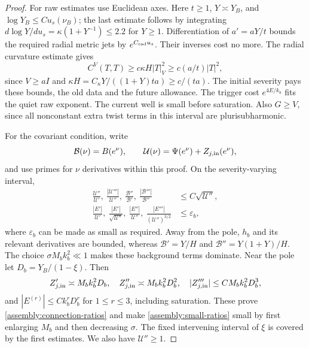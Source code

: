 \begin{proof}
For raw estimates use Euclidean axes. Here $t\geq1$, $Y\asymp Y_B$,
and $\log Y_B\leq C u_s(\nu_B)$; the last estimate follows by
integrating $d\log Y/du_s=\kappa(1+Y^{-1})\leq2.2$ for $Y\geq1$.
Differentiation of $a'=aY/t$ bounds the required radial metric jets
by $e^{C_{\rm rad}u_s}$. Their inverses cost no more. The radial
curvature estimate gives
\begin{equation}\label{assembly:euclidean-curvature}
 C^V(T,T)\geq c\kappa H|T|_V^2
 \geq c(a/t)|T|^2,
\end{equation}
since $V\geq aI$ and
$\kappa H=C_\kappa Y/((1+Y)ta)\geq c/(ta)$.
The initial severity pays these bounds, the old data and the future
allowance. The trigger cost $e^{4E/k_b}$ fits the quiet raw exponent.
The current well is small before saturation. Also $G\geq V$, since
all nonconstant extra twist terms in this interval are
plurisubharmonic.

For the covariant condition, write
\[
 \mathcal B(\nu)=B(e^\nu),\qquad
 \mathcal U(\nu)=\Psi(e^\nu)+Z_{j,\rm in}(e^\nu),
\]
and use primes for $\nu$ derivatives within this proof. On the
severity-varying interval,
\begin{align}
 \frac{\mathcal U''}{\mathcal U'},\
 \frac{|\mathcal U'''|}{\mathcal U''},\
 \frac{\mathcal B''}{\mathcal B'},\
 \frac{|\mathcal B'''|}{\mathcal B''}
 &\leq C\sqrt{\mathcal U''},
 \label{assembly:connection-ratios}\\
 \frac{|E'|}{\mathcal U'},\
 \frac{|E'|}{\sqrt{\mathcal U''}},\
 \frac{|E''|}{\mathcal U''},\
 \frac{|E'''|}{(\mathcal U'')^{3/2}}
 &\leq\varepsilon_b,
 \label{assembly:small-ratios}
\end{align}
where $\varepsilon_b$ can be made as small as required.
Away from the pole, $h_b$ and its relevant derivatives are bounded,
whereas
$\mathcal B'=Y/H$ and $\mathcal B''=Y(1+Y)/H$.
The choice $\sigma M_bk_b^2\ll1$ makes these background terms
dominate. Near the pole let $D_b=Y_B/(1-\xi)$. Then
\[
 Z_{j,\rm in}'\asymp M_bk_b^2D_b,\quad
 Z_{j,\rm in}''\asymp M_bk_b^2D_b^2,\quad
 |Z_{j,\rm in}'''|\leq C M_bk_b^2D_b^3,
\]
and $|E^{(r)}|\leq Ck_b^rD_b^r$ for $1\leq r\leq3$, including
saturation. These prove \eqref{assembly:connection-ratios} and
make \eqref{assembly:small-ratios} small by first enlarging $M_b$
and then decreasing $\sigma$. The fixed intervening interval of
$\xi$ is covered by the first estimates. We also have
$\mathcal U''\geq1$.


\end{proof}
